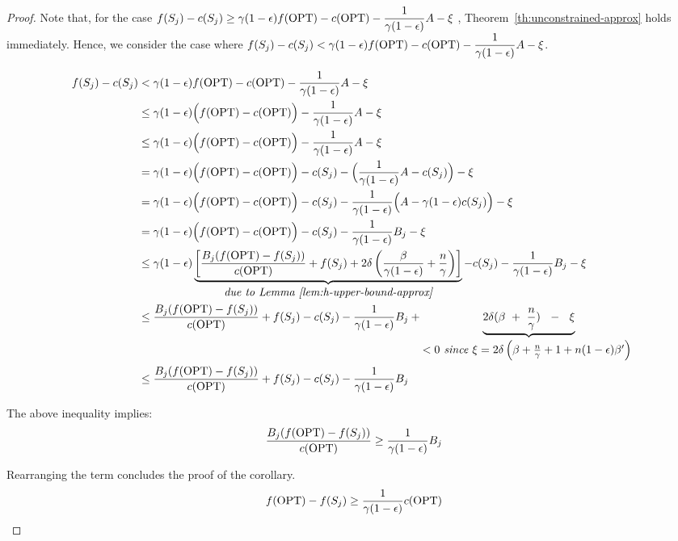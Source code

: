 \documentclass[10pt]{article} %
\theoremstyle{remark}
\newcommand{\OPT}{{\rm OPT}}
\begin{document}
\begin{proof}

   Note that, for the case $f(S_{j}) -c(S_{j})
            \geq \gamma (1-\epsilon)f(\OPT)-c(\OPT)-\displaystyle\frac{1}{\gamma (1-\epsilon)}A -\xi$ , Theorem~\ref{th:unconstrained-approx} holds immediately. 
   Hence, we consider the case where $f(S_{j}) -c(S_{j})
            <\gamma (1-\epsilon)f(\OPT)-c(\OPT)-\displaystyle\frac{1}{\gamma (1-\epsilon)}A -\xi$. 
   
   \begin{align*}
       f(S_{j}) -c(S_{j}) &
        <\gamma (1-\epsilon)f(\OPT)-c(\OPT)-\frac{1}{\gamma (1-\epsilon)}A -\xi\\
         &\leq \gamma (1-\epsilon)\Big(f(\OPT)-c(\OPT)\Big)-\frac{1}{\gamma (1-\epsilon)}A -\xi\\
        &\leq \gamma (1-\epsilon)\Big(f(\OPT)-c(\OPT)\Big)-\frac{1}{\gamma (1-\epsilon)}A -\xi\\
        &=\gamma (1-\epsilon)\Big(f(\OPT)-c(\OPT)\Big)- c(S_{j}) - \Big(\frac{1}{\gamma (1-\epsilon)}A -c(S_{j})\Big) -\xi\\
        &=\gamma (1-\epsilon)\Big(f(\OPT)-c(\OPT)\Big)- c(S_{j}) - \frac{1}{\gamma (1-\epsilon)}\Big(A -\gamma (1-\epsilon)c(S_{j})\Big) -\xi\\
        &=\gamma (1-\epsilon)\Big(f(\OPT)-c(\OPT)\Big)- c(S_{j}) - \frac{1}{\gamma (1-\epsilon)}B_j -\xi\\
        &\leq \gamma (1-\epsilon) \underbrace{\left[\displaystyle\frac{B_j(f(\OPT) - f(S_{j}))}{c(\OPT)} +f(S_{j})+2\delta\left(\frac{\beta}{\gamma(1-\epsilon)}+ \frac{n}{\gamma}\right)\right]}_{\mbox{\it due to Lemma~\ref{lem:h-upper-bound-approx}}}  - c(S_{j}) - \frac{1}{\gamma (1-\epsilon)}B_j  -\xi \\
        &\leq \displaystyle\frac{B_j(f(\OPT) - f(S_{j}))}{c(\OPT)} +f(S_{j}) - c(S_{j}) - \frac{1}{\gamma (1-\epsilon)}B_j  + \underbrace{2\delta(\beta ~+~ \frac{n}{\gamma}) ~~-~~ \xi}_{\mbox{\it $<0$ since $\xi = 2\delta\left(\beta+ \frac{n}{\gamma} + 1 + n(1-\epsilon)\beta'\right)$ }}\\
        &\leq \displaystyle\frac{B_j(f(\OPT) - f(S_{j}))}{c(\OPT)} +f(S_{j}) - c(S_{j}) - \frac{1}{\gamma (1-\epsilon)}B_j
   \end{align*}
   
    The above inequality implies:
    \[ \frac{B_j(f(\OPT) - f(S_{j}))}{c(\OPT)} \geq \frac{1}{\gamma (1-\epsilon)}B_j \]

    Rearranging the term concludes the proof of the corollary.
    \[f(\OPT) -f(S_{j}) \geq \frac{1}{\gamma(1-\epsilon)}c(\OPT)\]
\end{proof}
\end{document}
